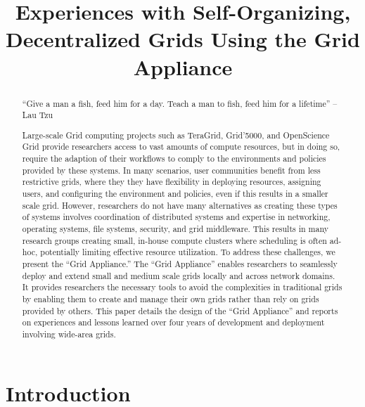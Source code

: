 \documentclass[conference]{IEEEtran}
\begin{document}
\title{Experiences with Self-Organizing, Decentralized Grids Using the Grid
Appliance}

\author{
}

\maketitle


\begin{abstract}

``Give a man a fish, feed him for a day.  Teach a man to fish, feed him for a
lifetime'' -- Lau Tzu

Large-scale Grid computing projects such as TeraGrid, Grid'5000, and
OpenScience Grid provide researchers access to vast amounts of compute
resources, but in doing so, require the adaption of their workflows to comply
to the environments and policies provided by these systems.  In many scenarios,
user communities benefit from less restrictive grids, where they they have
flexibility in deploying resources, assigning users, and configuring the
environment and policies, even if this results in a smaller scale grid.
However, researchers do not have many alternatives as creating these types of
systems involves coordination of distributed systems and expertise in
networking, operating systems, file systems, security, and grid middleware.
This results in many research groups creating small, in-house compute clusters
where scheduling is often ad-hoc, potentially limiting effective resource
utilization.  To address these challenges, we present the ``Grid Appliance.''
The ``Grid Appliance'' enables researchers to seamlessly deploy and extend
small and medium scale grids locally and across network domains.  It provides
researchers the necessary tools to avoid the complexities in traditional grids
by enabling them to create and manage their own grids rather than rely on grids
provided by others.  This paper details the design of the ``Grid Appliance''
and reports on experiences and lessons learned over four years of development
and deployment involving wide-area grids.

\end{abstract}

\section{Introduction}
\end{document}
